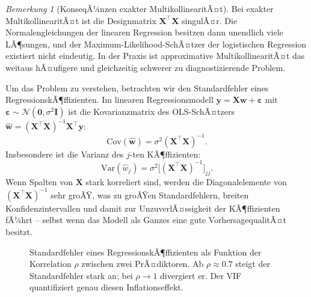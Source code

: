 ﻿\documentclass[12pt, a4paper]{article}
\theoremstyle{definition}
\theoremstyle{remark}
\newtheorem{remark}[theorem]{Bemerkung}
\newcommand{\vw}{\bm{w}}
\newcommand{\vy}{\bm{y}}
\newcommand{\vX}{\bm{X}}
\newcommand{\T}{\top}
\begin{document}
\begin{remark}[KonseqÃ¼nzen exakter MultikollinearitÃ¤t]
	Bei exakter MultikollinearitÃ¤t ist die Designmatrix $\vX^\T\vX$ singulÃ¤r. Die 
	Normalengleichungen der linearen Regression besitzen dann unendlich viele LÃ¶sungen, 
	und der Maximum-Likelihood-SchÃ¤tzer der logistischen Regression existiert nicht eindeutig. 
	In der Praxis ist approximative MultikollinearitÃ¤t das weitaus hÃ¤ufigere und 
	gleichzeitig schwerer zu diagnostizierende Problem.
\end{remark}

Um das Problem zu verstehen, betrachten wir den Standardfehler eines RegressionskÃ¶ffizienten.
Im linearen Regressionsmodell $\vy = \vX\vw + \bm{\varepsilon}$ mit $\bm{\varepsilon} \sim \mathcal{N}(\bm{0}, \sigma^2\mathbf{I})$
ist die Kovarianzmatrix des OLS-SchÃ¤tzers $\hat{\vw} = (\vX^\T\vX)^{-1}\vX^\T\vy$:
\begin{equation}
	\mathrm{Cov}(\hat{\vw}) = \sigma^2 (\vX^\T\vX)^{-1}.
	\label{eq:cov_ols}
\end{equation}
Insbesondere ist die Varianz des $j$-ten KÃ¶ffizienten:
\begin{equation}
	\mathrm{Var}(\hat{w}_j) = \sigma^2 \bigl[(\vX^\T\vX)^{-1}\bigr]_{jj}.
	\label{eq:var_cÃ¶ff}
\end{equation}
Wenn Spalten von $\vX$ stark korreliert sind, werden die Diagonalelemente von $(\vX^\T\vX)^{-1}$
sehr groÃŸ, was zu groÃŸen Standardfehlern, breiten Konfidenzintervallen und damit zur
UnzuverlÃ¤ssigkeit der KÃ¶ffizienten fÃ¼hrt -- selbst wenn das Modell als Ganzes eine gute
VorhersagequalitÃ¤t besitzt.

\begin{figure}[H]
	\centering
	\caption{Standardfehler eines RegressionskÃ¶ffizienten als Funktion der Korrelation $\rho$ 
		zwischen zwei PrÃ¤diktoren. Ab $\rho \approx 0.7$ steigt der Standardfehler stark an; 
		bei $\rho \to 1$ divergiert er. Der VIF quantifiziert genau diesen Inflationseffekt.}
	\label{fig:vif_se}
\end{figure}
\end{document}

